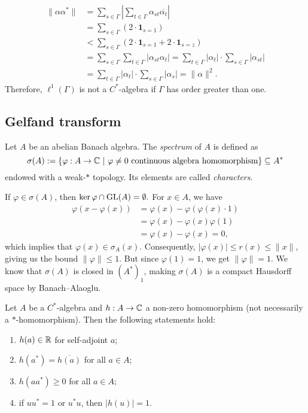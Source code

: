 \begin{example}
\begin{align*}
    \|\alpha \alpha^*\| &= \sum_{s \in \Gamma} \left| \sum_{t \in \Gamma} \alpha_{st} \overline{\alpha_{t}} \right|\\
    &= \sum_{s \in \Gamma} (2 \cdot \mathbf{1}_{s = 1})\\
    &< \sum_{s \in \Gamma} (2 \cdot \mathbf{1}_{s = 1} + 2\cdot \mathbf{1}_{s = z} )\\
    &= \sum_{s \in \Gamma} \sum_{t \in \Gamma} \left| \alpha_{st} {\alpha_{t}} \right| = \sum_{t \in \Gamma}|{\alpha_{t}}| \cdot \sum_{s \in \Gamma}  \left| \alpha_{st}  \right|\\
    &= \sum_{t \in \Gamma} \left|  {\alpha_{t}} \right| \cdot \sum_{s \in \Gamma} |\alpha_{s}| = \| \alpha\|^2.
  \end{align*}
  Therefore, $\ell^1 (\Gamma)$ is not a $C^*$-algebra if $\Gamma$ has order greater than one.
\end{example}

\subsection{Gelfand transform}

\begin{definition}
  Let $A$ be an abelian Banach algebra. The \emph{spectrum} of $A$ is defined as
  $$\sigma (A) := \{\varphi: A \to \mathbb {C}\ |\ \textrm{$\varphi \neq 0$ continuous algebra homomorphism}\} \subseteq A^*$$
  endowed with a weak-$*$ topology. Its elements are called \emph{characters}.
\end{definition}

If $\varphi \in \sigma (A)$, then $\ker \varphi \cap \operatorname{GL}(A) = \emptyset.$
For $x \in A$, we have 
\begin{align*}
  \varphi(x - \varphi(x)) &= \varphi(x) - \varphi(\varphi(x) \cdot 1)\\
  &= \varphi(x) - \varphi(x) \varphi(1)\\
  &= \varphi(x) - \varphi(x) = 0,
\end{align*}
which implies that $\varphi(x) \in \sigma_A(x)$.
Consequently, $|\varphi(x)| \leq r(x)\leq \|x\|$, giving us the bound $\|\varphi\| \leq 1$.
But since $\varphi(1) = 1$, we get $\|\varphi\| = 1$.
We know that $\sigma (A)$ is closed in $(A^*)_1$, making $\sigma(A)$ is a compact Hausdorff space by Banach--Alaoglu.

\begin{proposition}
  Let $A$ be a $C^*$-algebra and $h: A \to \mathbb {C}$ a non-zero homomorphism (not necessarily a $*$-homomorphism). 
  Then the following statements hold:
  \begin{enumerate}
    \item $h(a) \in \mathbb {R}$ for self-adjoint $a$;
    \item $h(a^*) = \overline{h(a)}$ for all $a \in A$;
    \item $h(a a^*) \geq 0$ for all $a \in A$;
    \item if $u u^* = 1$ or $u^* u$, then $|h(u)| = 1$. 
  \end{enumerate}
\end{proposition}

